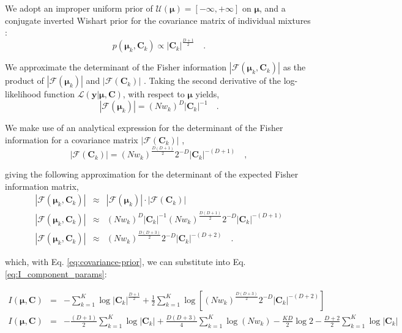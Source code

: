 \documentclass{article}
\newcommand{\vect}[1]{\boldsymbol{\mathbf{#1}}}
\def\veccov{\vect{C}}
\def\vecmean{\vect{\mu}}
\def\weight{w}
\def\datum{y}
\def\data{\vect{\datum}}
\def\likelihood{\mathcal{L}}
\begin{document}
We adopt an improper uniform prior of $\mathcal{U}(\vecmean) = [-\infty, +\infty]$ 
on $\vecmean$, and a conjugate inverted Wishart prior for the covariance matrix
of individual mixtures \citep[e.g., Section 5.2.3. of ][]{Schafer_1997}:
\begin{equation}
  p(\vecmean_k, \veccov_k) \propto |\veccov_k|^{\frac{D+1}{2}} \quad .
  \label{eq:covariance-prior}
\end{equation}

We approximate the determinant of the Fisher information 
$|\mathcal{F}(\vecmean_k, \veccov_k)|$ as the product of 
$|\mathcal{F}\left(\vecmean_k\right)|$ and $|\mathcal{F}\left(\veccov_k\right)|$ 
\citep{Oliver_1996,Roberts_1998}.  Taking the second derivative of the
log-likelihood function $\likelihood\left(\data|\vecmean,\veccov\right)$,
with respect to $\vecmean$ yields,
\begin{equation}
  |\mathcal{F}\left(\vecmean_k\right)| = (N\weight_k)^{D}|\veccov_k|^{-1} \quad .
\end{equation}

We make use of an analytical expression for the determinant of the Fisher
information for a covariance matrix $|\mathcal{F}(\veccov_k)|$ \citep{Dwyer_1967,Magnus_1988,Kasarapu_2015},
\begin{equation}
  |\mathcal{F}\left(\veccov_k\right)| = (N\weight_k)^\frac{D(D+1)}{2}2^{-D}|\veccov_k|^{-(D+1)} \quad ,
\end{equation}

\noindent{}giving the following approximation for the determinant of the
expected Fisher information matrix,
\begin{eqnarray}
  |\mathcal{F}(\vecmean_k,\veccov_k)| & \approx & |\mathcal{F}(\vecmean_k)|\cdot|\mathcal{F}(\veccov_k)| \nonumber \\
  |\mathcal{F}(\vecmean_k,\veccov_k)| & \approx & (N\weight_k)^{D}|\veccov_k|^{-1}(N\weight_k)^\frac{D(D+1)}{2}2^{-D}|\veccov_k|^{-(D+1)} \nonumber \\
  |\mathcal{F}(\vecmean_k,\veccov_k)| & \approx & (N\weight_k)^\frac{D(D+3)}{2}2^{-D}|\veccov_k|^{-(D+2)} \quad .
\end{eqnarray}

\noindent{}which, with Eq. \ref{eq:covariance-prior}, we can substitute into Eq. \ref{eq:I_component_params}:

\begin{eqnarray}
I(\vecmean,\veccov) &=& -\sum_{k=1}^{K}\log{|\veccov_k|^{\frac{D + 1}{2}}}
 + \frac{1}{2}\sum_{k=1}^{K}\log{\left[(N\weight_k)^\frac{D(D+3)}{2}2^{-D}|\veccov_k|^{-(D+2)}\right]} \nonumber \\
I(\vecmean,\veccov) &=& -\frac{(D + 1)}{2}\sum_{k=1}^{K}\log{|\veccov_k|}
 + \frac{D(D+3)}{4}\sum_{k=1}^{K}\log{\left(N\weight_k\right)} -\frac{KD}{2}\log{2} -\frac{D+2}{2}\sum_{k=1}^{K}\log{|\veccov_k|} \nonumber \\
\end{eqnarray}
\end{document}
